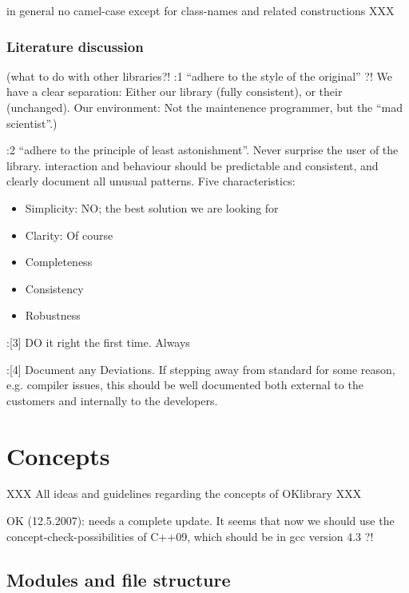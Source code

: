 \documentclass{book}
\begin{document}
in general no camel-case except for class-names and related constructions XXX




\subsection{Literature discussion}
\label{sec:generalprinciplesliterature}

(what to do with other libraries?! \cite{OKL_MisfeldtBumgardnerGray2004CppStyle}:1 ``adhere to the style of the original'' ?! We have a clear separation: Either our library (fully consistent), or their (unchanged). Our environment: Not the maintenence programmer, but the ``mad scientist''.)

\cite{OKL_MisfeldtBumgardnerGray2004CppStyle}:2 ``adhere to the principle of least astonishment''. Never surprise the user of the library. interaction and behaviour should be predictable and consistent, and clearly document all unusual patterns. Five characteristics:
\begin{itemize}
\item Simplicity: NO; the best solution we are looking for
\item Clarity: Of course
\item Completeness
\item Consistency
\item Robustness
\end{itemize}

\cite{OKL_MisfeldtBumgardnerGray2004CppStyle}:[3] DO it right the first time. Always

\cite{OKL_MisfeldtBumgardnerGray2004CppStyle}:[4] Document any Deviations. If stepping away from standard for some reason, e.g. compiler issues, this should be well documented both external to the customers and internally to the developers.




\chapter{Concepts}
\label{cha:Concepts}

XXX All ideas and guidelines regarding the concepts of OKlibrary XXX

OK (12.5.2007): needs a complete update. It seems that now we should use the concept-check-possibilities of C++09, which should be in gcc version 4.3 ?!



\section{Modules and file structure}
\label{sec:Modulesfilestructure}
\end{document}
